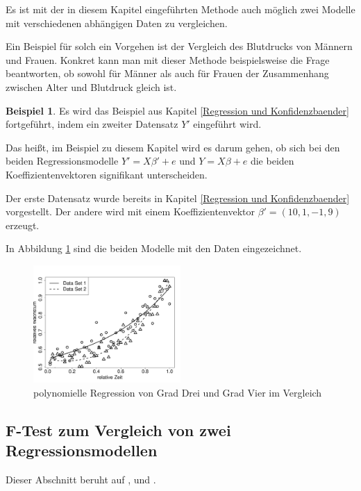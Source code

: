 \documentclass[12pt,a4paper]{article}
\theoremstyle{definition}
\newtheorem{Beispiel}[Definition]{Beispiel}
\theoremstyle{definition}
\theoremstyle{definition}
\theoremstyle{definition}
\newcommand{\betatwo}{(10,1,-1,9)}
\newcommand{\betatwodat}[0]{\left[ \begin{array}{c} \beta_{0,2} \\ \beta_{1,2} \\ \beta_{1,3} \\ \beta_{1,4} \end{array} \right]}
\newcommand{\betaonedat}[0]{\left[ \begin{array}{c} \beta_{0,1} \\ \beta_{1,1} \end{array} \right]}
\begin{document}
Es ist mit der in diesem Kapitel eingeführten Methode auch möglich zwei Modelle mit verschiedenen abhängigen Daten zu vergleichen. 

Ein Beispiel für solch ein Vorgehen ist der Vergleich des Blutdrucks von Männern und Frauen. Konkret kann man mit dieser Methode beispielsweise die Frage beantworten, ob sowohl für Männer als auch für Frauen der Zusammenhang zwischen Alter und Blutdruck gleich ist.

\begin{Beispiel}
Es wird das Beispiel aus Kapitel \ref{Regression und Konfidenzbaender} fortgeführt, indem ein zweiter Datensatz $Y'$ eingeführt wird.

Das heißt, im Beispiel zu diesem Kapitel wird es darum gehen, ob sich bei den beiden Regressionsmodelle $Y' = X \beta ' + e$ und $Y = X \beta + e$ die beiden Koeffizientenvektoren signifikant unterscheiden.

Der erste Datensatz wurde bereits in Kapitel \ref{Regression und Konfidenzbaender} vorgestellt. Der andere wird mit einem Koeffizientenvektor $\beta' = \betatwo$ erzeugt.

In Abbildung \ref{Vergleich-Bsp} sind die beiden Modelle mit den Daten eingezeichnet.

\begin{figure}[H] 
  \centering
     \includegraphics[width=0.5\textwidth]{Bsp-beide-in-einem-plot}
  \caption{polynomielle Regression von Grad Drei und Grad Vier im Vergleich}
  \label{Vergleich-Bsp}
\end{figure}

%
\end{Beispiel}




\subsection{F-Test zum Vergleich von zwei Regressionsmodellen}
\label{Vergleich F-Test}
Dieser Abschnitt beruht auf \cite[9-15]{Liu64} ,\cite[114-115]{Liu64} und \cite{Draper98}.
\end{document}
